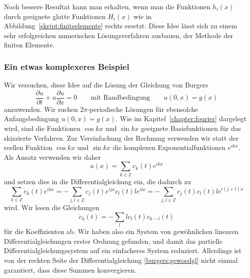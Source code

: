 Noch bessere Resultat kann man erhalten, wenn man die Funktionen
$h_i(x)$ durch geeignete glatte Funktionen $H_i(x)$ wie in
Abbildung~\ref{skript:finiteelemente} rechts ersetzt.
Diese Idee lässt sich zu einem sehr erfolgreichen numerischen
Lösungsverfahren ausbauen, der Methode der finiten Elemente.

\subsubsection{Ein etwas komplexeres Beispiel\label{subsubsection:komplexeres}}
Wir versuchen, diese Idee auf die Lösung der Gleichung von
Burgers
\begin{equation}
\frac{\partial u}{\partial t} + u\frac{\partial u}{\partial x}=0
\qquad\text{mit Randbedingung}\qquad
u(0,x)=g(x)
\label{skript:pde:burgersequation}
\end{equation}
anzuwenden.
Wir suchen $2\pi$-periodische Lösungen für ebensolche Anfangsbedingung
$u(0,x)=g(x)$.
Wie im Kapitel~\ref{chapter:fourier} dargelegt wird, sind die Funktionen
$\cos kx$ und $\sin kx$ geeignete Basisfunktionen für das skizzierte Verfahren.
Zur Vereinfachung der Rechnung verwenden wir statt der reellen Funktion
$\cos kx$ und $\sin kx$ die komplexen Exponentialfunktionen $e^{ikx}$.
Als Ansatz verwenden wir daher
\[
u(x) = \sum_{k\in\mathbb Z} c_k(t) e^{ikx}
\]
und setzen dies in die Differentialgleichung ein, die dadurch zu
\[
\sum_{k\in\mathbb Z} \dot c_k(t) e^{ikx}
=
-\sum_{j,l\in\mathbb Z} c_j(t)e^{ijx} c_l(t) le^{ilx}
=
-\sum_{j,l\in\mathbb Z} c_j(t)c_l(t) le^{i(j+l)x}
\]
wird.
Wir lesen die Gleichungen
\begin{equation}
\dot c_k(t) = -\sum_{l} lc_l(t)c_{k-l}(t)
\label{burgers:gewoedgl}
\end{equation}
für die Koeffizienten ab.
Wir haben also ein System von gewöhnlichen linearen Differentialgleichungen
erster Ordnung gefunden, und damit das partielle Differentialgleichungssystem
auf ein einfacheres System reduziert.
Allerdings ist von der rechten Seite der Differentialgleichung
\eqref{burgers:gewoedgl}
nicht einmal garantiert, dass diese Summen konvergieren.

